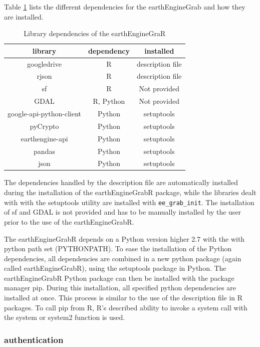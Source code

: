 Table \ref*{dependencies} lists the different dependencies for the earthEngineGrab and how they are installed. 

\begin{table}[h]
	\begin{tabularx}{\textwidth}{|c|c|c|}
		\hline
		\textbf{library} & \textbf{dependency} & \textbf{installed}  \\
		\hline
		googledrive & R  & description file  \\
		rjson & R  & description file  \\
		sf & R  & Not provided  \\
		GDAL & R, Python  & Not provided  \\
		google-api-python-client & Python  & setuptools  \\
		pyCrypto & Python  & setuptools  \\
		earthengine-api & Python  & setuptools  \\        
		pandas & Python  & setuptools  \\        
		json & Python  & setuptools  \\        
		\hline
	\end{tabularx}
	\caption{Library dependencies of the earthEngineGraR}
	\label{dependencies}
\end{table}

The dependencies handled by the description file are automatically installed during the installation of the earthEngineGrabR package, while the libraries dealt with with the setuptools utility are installed with \texttt{ee\_grab\_init}. The installation of sf and GDAL is not provided and has to be manually installed by the user prior to the use of the earthEngineGrabR.

The earthEngineGrabR depends on a Python version higher 2.7 with the with python path set (PYTHONPATH). To ease the installation of the Python dependencies, all dependencies are combined in a new python package (again called earthEngineGrabR), using the setuptools package in Python. The earthEngineGrabR Python package can then be installed with the package manager pip. During this installation, all specified python dependencies are installed at once. This process is similar to the use of the description file in R packages. To call pip from R, R's described ability to invoke a system call with the system or system2 function is used.

\subsubsection{authentication}

